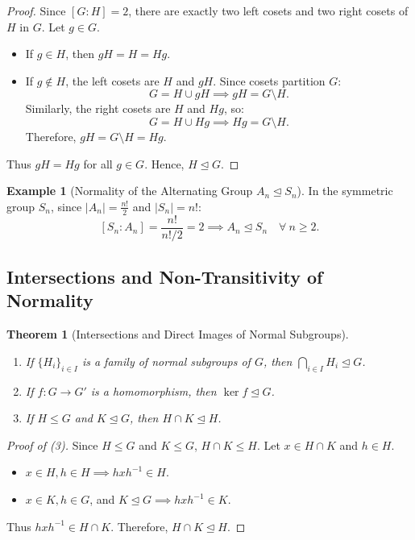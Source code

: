 \documentclass[12pt]{article}
\theoremstyle{definition}
\newtheorem{example}[definition]{Example}
\theoremstyle{plain}
\newtheorem{theorem}{Theorem}[section]
\begin{document}
\begin{proof}
Since $[G : H] = 2$, there are exactly two left cosets and two right cosets of $H$ in $G$.
Let $g \in G$.
\begin{itemize}
    \item If $g \in H$, then $gH = H = Hg$.
    \item If $g \notin H$, the left cosets are $H$ and $gH$. Since cosets partition $G$:
    \[
    G = H \cup gH \implies gH = G \setminus H.
    \]
    Similarly, the right cosets are $H$ and $Hg$, so:
    \[
    G = H \cup Hg \implies Hg = G \setminus H.
    \]
    Therefore, $gH = G \setminus H = Hg$.
\end{itemize}
Thus $gH = Hg$ for all $g \in G$. Hence, $\boxed{H \trianglelefteq G}$.
\end{proof}

\begin{example}[Normality of the Alternating Group $A_n \trianglelefteq S_n$]
In the symmetric group $S_n$, since $|A_n| = \frac{n!}{2}$ and $|S_n| = n!$:
\[
[S_n : A_n] = \frac{n!}{n!/2} = 2 \implies \boxed{A_n \trianglelefteq S_n \quad \forall\ n \ge 2}.
\]
\end{example}

\subsection{Intersections and Non-Transitivity of Normality}

\begin{theorem}[Intersections and Direct Images of Normal Subgroups]
\begin{enumerate}
    \item If $\{H_i\}_{i \in I}$ is a family of normal subgroups of $G$, then $\bigcap_{i \in I} H_i \trianglelefteq G$.
    \item If $f: G \to G'$ is a homomorphism, then $\ker f \trianglelefteq G$.
    \item If $H \le G$ and $K \trianglelefteq G$, then $H \cap K \trianglelefteq H$.
\end{enumerate}
\end{theorem}

\begin{proof}[Proof of (3)]
Since $H \le G$ and $K \le G$, $H \cap K \le H$.
Let $x \in H \cap K$ and $h \in H$.
\begin{itemize}
    \item $x \in H, h \in H \implies hxh^{-1} \in H$.
    \item $x \in K, h \in G$, and $K \trianglelefteq G \implies hxh^{-1} \in K$.
\end{itemize}
Thus $hxh^{-1} \in H \cap K$. Therefore, $H \cap K \trianglelefteq H$.
\end{proof}
\end{document}
